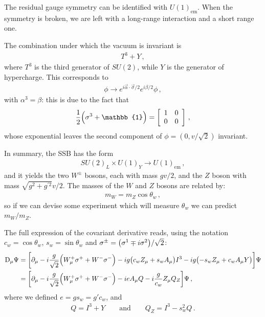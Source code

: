 \documentclass[main.tex]{subfiles}
\begin{document}
The residual gauge symmetry can be identified with \(U(1)_{\text{em}}\).
When the symmetry is broken, we are left with a long-range interaction and a short range one.

The combination under which the vacuum is invariant is 
%
\begin{align}
T^{3} + Y
\,,
\end{align}
%
where \(T^{3}\) is the third generator of \(SU(2)\), while \(Y\) is the generator of hypercharge.
This corresponds to 
%
\begin{align}
\phi \to e^{i \vec{\alpha} \cdot \vec{\sigma} / 2} e^{i \beta /2} \phi 
\,,
\end{align}
%
with \(\alpha^{3} = \beta \): this is due to the fact that 
%
\begin{align}
\frac{1}{2} \qty(\sigma^{3} + \mathbb{1}) =  \left[\begin{array}{cc}
1 & 0 \\ 
0 & 0
\end{array}\right]
\,,
\end{align}
%
whose exponential leaves the second component of \(\phi = (0, v/\sqrt{2})\) invariant.

In summary, the SSB has the form 
%
\begin{align}
SU(2)_L \times U(1)_{Y} \to U(1)_{\text{em}}
\,,
\end{align}
%
and it yields the two \(W^{\pm}\) bosons, each with mass \(gv/2\), and the \(Z\) boson with mass \(\sqrt{g^2+g^{\prime 2}} v/2\). 
The masses of the \(W\) and \(Z\) bosons are related by: 
%
\begin{align}
m_W = m_Z \cos \theta_{w}
\,,
\end{align}
%
so if we can devise some experiment which will measure \(\theta_{w}\) we can predict \(m_W / m_Z\). 

The full expression of the covariant derivative reads, using the notation \(c_w = \cos \theta_{w}\), \(s_w = \sin \theta_{w}\) and \(\sigma^{\pm} = \qty(\sigma^{1} \mp i \sigma^{2}) / \sqrt{2}\):
%
\begin{align}
\mathrm{D}_{\mu } \Psi &= \qty[
    \partial_{\mu } 
    -i \frac{g}{\sqrt{2}} \qty(W^{+}_{\mu } \sigma^{+}+ W^{-}\sigma^{-})
    - ig \qty(c_{w} Z_\mu + s_{w}A_{\mu }) I^{3}
    - ig \qty(- s_{w} Z_\mu + c_{w} A_{\mu }Y)
] \Psi  \\
&= \qty[\partial_{\mu } 
    - i \frac{g}{\sqrt{2}} \qty(W^{+}_{\mu } \sigma^{+}+ W^{-}\sigma^{-})
    - i e A_{\mu }Q 
    - i \frac{g}{c_w} Z_\mu Q_Z
] \Psi 
\,,
\end{align}
%
where we defined \(e = g s_w = g' c_w \), and 
%
\begin{align}
Q = I^{3} + Y 
\qquad \text{and} \qquad
Q_Z = I^{3} - s_w^2 Q
\,.
\end{align}
\end{document}
